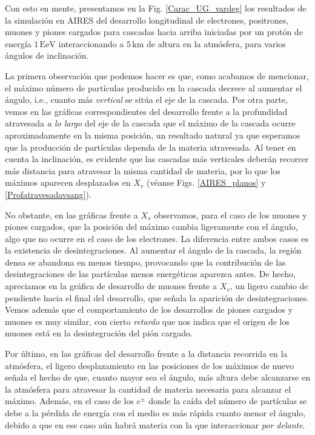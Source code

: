 \documentclass[12 pt, a4paper]{article} %
\numberwithin{equation}{section}
\numberwithin{figure}{section}
\numberwithin{table}{section}
\begin{document}
Con esto en mente, presentamos en la Fig. \ref{Carac_UG_vardeg} los resultados de la simulación en AIRES del desarrollo longitudinal de electrones, positrones, muones y piones cargados para cascadas hacia arriba iniciadas por un protón de energía $1\,\mathrm{EeV}$ interaccionando a $5\,\mathrm{km}$ de altura en la atmósfera, para varios ángulos de inclinación.

La primera observación que podemos hacer es que, como acabamos de mencionar, el máximo número de partículas producido en la cascada decrece al aumentar el ángulo, i.e., cuanto más \textit{vertical} se sitúa el eje de la cascada. Por otra parte, vemos en las gráficas correspondientes del desarrollo frente a la profundidad atravesada \textit{a lo largo} del eje de la cascada que el máximo de la cascada ocurre aproximadamente en la misma posición, un resultado natural ya que esperamos que la producción de partículas dependa de la materia atravesada. Al tener en cuenta la inclinación, es evidente que las cascadas más verticales deberán recorrer más distancia para atravesar la misma cantidad de materia, por lo que los máximos aparecen desplazados en $X_v$ (véanse Figs. \ref{AIRES_planos} y \ref{Profatravesadavsang}). 

No obstante, en las gráficas frente a $X_s$ observamos, para el caso de los muones y piones cargados, que la posición del máximo cambia ligeramente con el ángulo, algo que no ocurre en el caso de los electrones. La diferencia entre ambos casos es la existencia de desintegraciones. Al aumentar el ángulo de la cascada, la región densa se abandona en menos tiempo, provocando que la contribución de las desintegraciones de las partículas menos energéticas aparezca antes. De hecho, apreciamos en la gráfica de desarrollo de muones frente a $X_v$, un ligero cambio de pendiente hacia el final del desarrollo, que señala la aparición de desintegraciones. Vemos además que el comportamiento de los desarrollos de piones cargados y muones es muy similar, con cierto \textit{retardo} que nos indica que el origen de los muones está en la desintegración del pión cargado.

Por último, en las gráficas del desarrollo frente a la distancia recorrida en la atmósfera, el ligero desplazamiento en las posiciones de los máximos de nuevo señala el hecho de que, cuanto mayor sea el ángulo, más altura debe alcanzarse en la atmósfera para atravesar la cantidad de materia necesaria para alcanzar el máximo. Además, en el caso de los $e^\pm$ donde la caída del número de partículas se debe a la pérdida de energía con el medio es más rápida cuanto menor el ángulo, debido a que en ese caso aún habrá materia con la que interaccionar \textit{por delante}.
\end{document}
